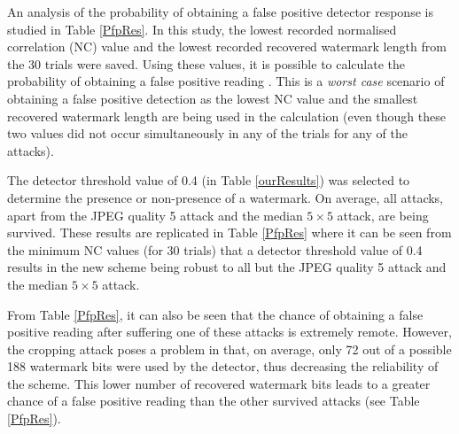 \documentclass[10pt,twocolumn]{article}
\begin{document}
An analysis of the probability of obtaining a false positive
detector response is studied in Table \ref{PfpRes}. In this study, the
lowest recorded normalised correlation (NC) value
and the lowest recorded recovered watermark length
from the 30 trials were saved.
Using these values, it is possible to calculate the probability of obtaining a false 
positive reading \cite{kundurPfp}. This is a \emph{worst case} scenario of obtaining a false positive
detection as the lowest NC value and the smallest recovered watermark length are being used in the calculation
(even though these two values did not occur simultaneously in any of the trials for any of the attacks).






The detector threshold value of 0.4 (in Table \ref{ourResults}) was selected to determine the
presence or non-presence of a watermark. On average, all attacks, apart from the JPEG quality 5 attack and
the median $5\times 5$ attack, are being survived.
These results are replicated in Table \ref{PfpRes} where it can be seen from the minimum NC values (for 30 trials) that 
a detector threshold value of 0.4 results in the new scheme being robust to all but the JPEG quality 5 attack and
the median $5\times 5$ attack.

From Table \ref{PfpRes}, it can also be seen that the chance of obtaining a 
false positive reading after suffering one of these attacks is extremely remote.
However, the cropping attack poses a problem in that, on average, only 72 out of a possible 188 watermark bits were
used by the detector, thus decreasing the reliability of the scheme. This lower number of recovered 
watermark bits leads to a greater chance of a false positive reading than the other survived attacks
(see Table \ref{PfpRes}).  
\end{document}
